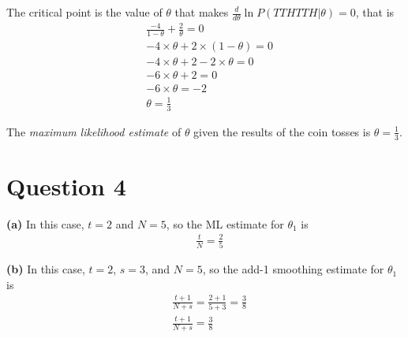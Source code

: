 \documentclass[leqno]{article}
\begin{document}
\noindent The critical point is the value of $\theta$ that makes $\frac{d}{d\theta}\ln P(TTHTTH|\theta) = 0$, that is
\begin{equation*}
\begin{split}
&\frac{-4}{1 - \theta} + \frac{2}{\theta} = 0
\\
&-4 \times \theta + 2 \times (1 - \theta) = 0
\\
&-4 \times \theta + 2 - 2 \times \theta = 0
\\
&-6 \times \theta + 2 = 0
\\
&-6 \times \theta = -2
\\
& \theta = \frac{1}{3}
\end{split}  
\end{equation*} 

\noindent The \textit{maximum likelihood estimate} of $\theta$ given the results of the coin tosses is $\theta = \frac{1}{3}$.

\hfill

\section*{Question 4}

\noindent \textbf{(a)} In this case, $t = 2$ and $N = 5$, so the ML estimate for $\theta_1$ is
\begin{equation*}
\begin{split}
&\frac{t}{N} = \frac{2}{5}
\end{split}  
\end{equation*} 

\hfill

\noindent \textbf{(b)} In this case, $t = 2$, $s = 3$, and $N = 5$, so the add-1 smoothing estimate for $\theta_1$ is 
\begin{equation*}
\begin{split}
&\frac{t + 1}{N + s} = \frac{2 + 1}{5 + 3} = \frac{3}{8}
\\
&\frac{t + 1}{N + s} = \frac{3}{8}
\end{split}  
\end{equation*} 

\hfill
\end{document}
